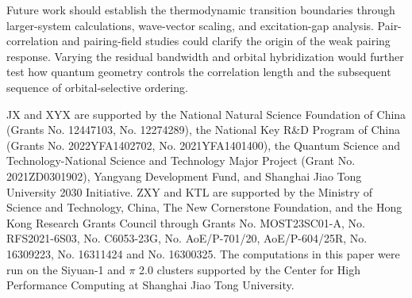 \documentclass[
  prb,
  reprint,
  superscriptaddress,
  amsmath,
  amssymb,
  longbibliography
]{revtex4-2}
\begin{document}
Future work should establish the thermodynamic
transition boundaries through larger-system calculations,
wave-vector scaling, and excitation-gap analysis.
Pair-correlation and pairing-field studies could
clarify the origin of the weak pairing response.
Varying the residual bandwidth and orbital
hybridization would further test how quantum geometry
controls the correlation length and the subsequent
sequence of orbital-selective ordering.



\begin{acknowledgments}
JX and XYX are supported by the National Natural Science Foundation of China (Grants No. 12447103, No. 12274289), the National Key R\&D Program of China (Grants No. 2022YFA1402702, No. 2021YFA1401400), the Quantum Science and Technology-National Science and Technology Major Project (Grant No. 2021ZD0301902), Yangyang Development Fund, and Shanghai Jiao Tong University 2030 Initiative. ZXY and KTL are supported by the Ministry
of Science and Technology, China, The New Cornerstone Foundation, and the Hong Kong Research Grants
Council through Grants No. MOST23SC01-A, No.
RFS2021-6S03, No. C6053-23G, No. AoE/P-701/20,
AoE/P-604/25R, No. 16309223, No. 16311424 and No.
16300325.
The computations in this paper were run on the Siyuan-1 and $\pi$ 2.0 clusters supported by the Center for High Performance Computing at Shanghai Jiao Tong University.
\end{acknowledgments}

%

\end{document}
